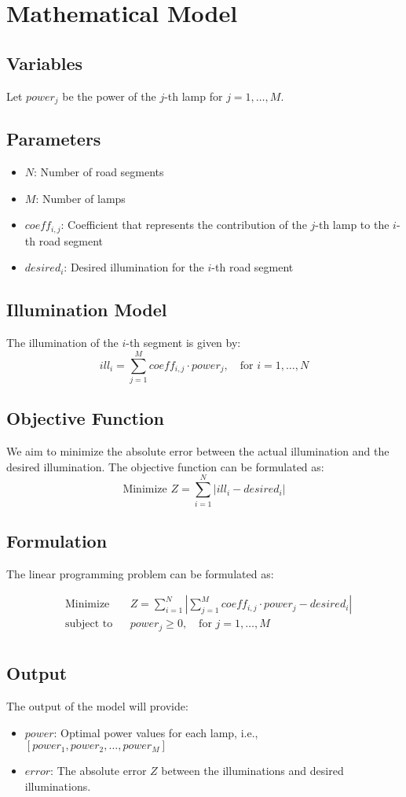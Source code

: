 \documentclass{article}
\begin{document}
\section*{Mathematical Model}

\subsection*{Variables}
Let \( power_j \) be the power of the \( j \)-th lamp for \( j = 1, \ldots, M \).

\subsection*{Parameters}
\begin{itemize}
    \item \( N \): Number of road segments
    \item \( M \): Number of lamps
    \item \( coeff_{i,j} \): Coefficient that represents the contribution of the \( j \)-th lamp to the \( i \)-th road segment
    \item \( desired_i \): Desired illumination for the \( i \)-th road segment
\end{itemize}

\subsection*{Illumination Model}
The illumination of the \( i \)-th segment is given by:
\[
ill_i = \sum_{j=1}^{M} coeff_{i,j} \cdot power_j, \quad \text{for } i = 1, \ldots, N
\]

\subsection*{Objective Function}
We aim to minimize the absolute error between the actual illumination and the desired illumination. The objective function can be formulated as:
\[
\text{Minimize } Z = \sum_{i=1}^{N} |ill_i - desired_i|
\]

\subsection*{Formulation}
The linear programming problem can be formulated as:

\[
\begin{aligned}
& \text{Minimize} && Z = \sum_{i=1}^{N} | \sum_{j=1}^{M} coeff_{i,j} \cdot power_j - desired_i| \\
& \text{subject to} && power_j \geq 0, \quad \text{for } j = 1, \ldots, M\\
\end{aligned}
\]

\subsection*{Output}
The output of the model will provide:
\begin{itemize}
    \item \( power \): Optimal power values for each lamp, i.e., \( [power_1, power_2, \ldots, power_M] \)
    \item \( error \): The absolute error \( Z \) between the illuminations and desired illuminations.
\end{itemize}
\end{document}

